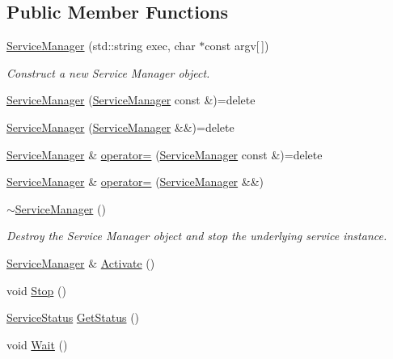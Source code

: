\subsection*{Public Member Functions}
\begin{DoxyCompactItemize}
\item 
\hyperlink{classServiceManager_aa39c0fb00323db65ef805b2d5914d834}{Service\+Manager} (std\+::string exec, char $\ast$const argv\mbox{[}$\,$\mbox{]})
\begin{DoxyCompactList}\small\item\em Construct a new Service Manager object. \end{DoxyCompactList}\item 
\hyperlink{classServiceManager_a31781207d85e0db3dd96757c9faf619d}{Service\+Manager} (\hyperlink{classServiceManager}{Service\+Manager} const \&)=delete
\item 
\hyperlink{classServiceManager_a019107c8c06276720e732f40b0d8847a}{Service\+Manager} (\hyperlink{classServiceManager}{Service\+Manager} \&\&)=delete
\item 
\hyperlink{classServiceManager}{Service\+Manager} \& \hyperlink{classServiceManager_a7c9eec262e4a561a78ecf161b0d7eb5a}{operator=} (\hyperlink{classServiceManager}{Service\+Manager} const \&)=delete
\item 
\hyperlink{classServiceManager}{Service\+Manager} \& \hyperlink{classServiceManager_a74f02128751d290a31a4cc73cf3a26ff}{operator=} (\hyperlink{classServiceManager}{Service\+Manager} \&\&)
\item 
\hyperlink{classServiceManager_a87b207df58ccd316320d490c003c7eda}{$\sim$\+Service\+Manager} ()
\begin{DoxyCompactList}\small\item\em Destroy the Service Manager object and stop the underlying service instance. \end{DoxyCompactList}\item 
\hyperlink{classServiceManager}{Service\+Manager} \& \hyperlink{classServiceManager_a7d511091ce6f7a368bfc6d8caebd25c0}{Activate} ()
\item 
void \hyperlink{classServiceManager_abdeb5c08d4a1243f43477cda8109446a}{Stop} ()
\item 
\hyperlink{classServiceManager_af3f2b1502eece536d0e4c8d3f2fa439d}{Service\+Status} \hyperlink{classServiceManager_add57f37806af173b969249bd97048928}{Get\+Status} ()
\item 
void \hyperlink{classServiceManager_abc19f11c2147855029dad4c4ce4de0d7}{Wait} ()
\end{DoxyCompactItemize}
